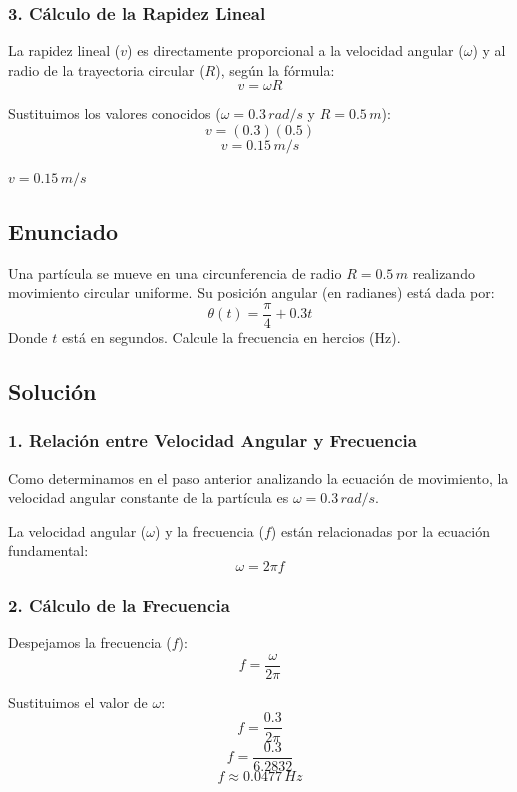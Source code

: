 \documentclass[12pt, a4paper]{article}
\begin{document}
\subsubsection*{3. Cálculo de la Rapidez Lineal}
La rapidez lineal ($v$) es directamente proporcional a la velocidad angular ($\omega$) y al radio de la trayectoria circular ($R$), según la fórmula:
$$ v = \omega R $$

Sustituimos los valores conocidos ($\omega = 0.3 \, \si{rad/s}$ y $R = 0.5 \, \si{m}$):
$$ v = (0.3)(0.5) $$
$$ v = 0.15 \, \si{m/s} $$

\begin{tcolorbox}[colback=green!5!white, colframe=green!50!black, title=Respuesta Final]
\centering \Large $v = 0.15 \, \si{m/s}$
\end{tcolorbox}

\newpage

\subsection*{Enunciado}
Una partícula se mueve en una circunferencia de radio $R = 0.5 \, \si{m}$ realizando movimiento circular uniforme. Su posición angular (en radianes) está dada por:
$$ \theta(t) = \frac{\pi}{4} + 0.3 t $$
Donde $t$ está en segundos. Calcule la frecuencia en hercios (Hz).

\subsection*{Solución}

\subsubsection*{1. Relación entre Velocidad Angular y Frecuencia}
Como determinamos en el paso anterior analizando la ecuación de movimiento, la velocidad angular constante de la partícula es $\omega = 0.3 \, \si{rad/s}$.

La velocidad angular ($\omega$) y la frecuencia ($f$) están relacionadas por la ecuación fundamental:
$$ \omega = 2\pi f $$

\subsubsection*{2. Cálculo de la Frecuencia}
Despejamos la frecuencia ($f$):
$$ f = \frac{\omega}{2\pi} $$

Sustituimos el valor de $\omega$:
$$ f = \frac{0.3}{2\pi} $$
$$ f = \frac{0.3}{6.2832} $$
$$ f \approx 0.0477 \, \si{Hz} $$
\end{document}
